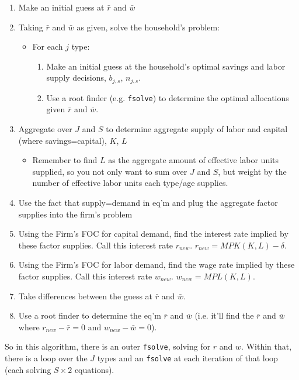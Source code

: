 \documentclass[letterpaper,12pt]{article}
\theoremstyle{definition}
\begin{document}
\begin{spacing}{1.5}
\begin{enumerate}
\item Make an initial guess at $\bar{r}$ and $\bar{w}$
\item Taking $\bar{r}$ and $\bar{w}$ as given, solve the household's problem:
	\begin{itemize}
	\item For each $j$ type:
		\begin{enumerate}
		\item Make an initial guess at the household's optimal savings and labor supply decisions, $b_{j,s}$, $n_{j,s}$.
		\item Use a root finder (e.g. \texttt{fsolve}) to determine the optimal allocations given $\bar{r}$ and $\bar{w}$.
		\end{enumerate}
	\end{itemize}
\item Aggregate over $J$ and $S$ to determine aggregate supply of labor and capital (where savings=capital), $K$, $L$
	\begin{itemize}
	\item Remember to find $L$ as the aggregate amount of effective labor units supplied, so you not only want to sum over $J$ and $S$, but weight by the number of effective labor units each type/age supplies.
	\end{itemize}
\item Use the fact that supply=demand in eq'm and plug the aggregate factor supplies into the firm's problem
\item Using the Firm's FOC for capital demand, find the interest rate implied by these factor supplies.  Call this interest rate $r_{new}$.  $r_{new}=MPK(K,L)-\delta$.
\item Using the Firm's FOC for labor demand, find the wage rate implied by these factor supplies.  Call this interest rate $w_{new}$.  $w_{new}=MPL(K,L)$.
\item Take differences between the guess at $\bar{r}$ and $\bar{w}$.  
\item Use a root finder to determine the eq'm $\bar{r}$ and $\bar{w}$ (i.e. it'll find the $\bar{r}$ and $\bar{w}$ where $r_{new}-\bar{r}=0$ and $w_{new}-\bar{w}=0$).
\end{enumerate}

So in this algorithm, there is an outer \texttt{fsolve}, solving for $r$ and $w$.  Within that, there is a loop over the $J$ types and an \texttt{fsolve} at each iteration of that loop (each solving $S\times 2$ equations).


\end{spacing}
\end{document}
